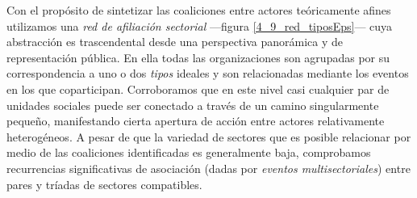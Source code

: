 \documentclass[letterpaper, 11pt]{book}
\theoremstyle{definition}
\theoremstyle{remark}
\begin{document}




Con el propósito de sintetizar las coaliciones entre actores teóricamente afines utilizamos una \emph{red de afiliación sectorial} ---figura \ref{4_9_red_tiposEps}--- cuya abstracción es trascendental desde una perspectiva panorámica y de representación pública. 
En ella todas las organizaciones son agrupadas por su correspondencia a uno o dos \emph{tipos} ideales y son relacionadas mediante los eventos en los que coparticipan. 
Corroboramos que en este nivel casi cualquier par de unidades sociales puede ser conectado a través de un camino singularmente pequeño, manifestando cierta apertura de acción entre actores relativamente heterogéneos. 
A pesar de que la variedad de sectores que es posible relacionar por medio de las coaliciones identificadas es generalmente baja, comprobamos recurrencias significativas de asociación (dadas por \emph{eventos multisectoriales}) entre pares y tríadas de sectores compatibles. 
\end{document}
